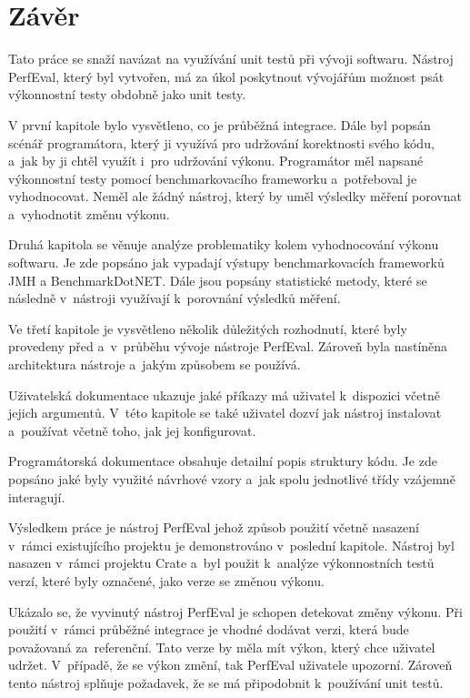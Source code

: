 \chapter{Závěr}

Tato práce se snaží navázat na využívání unit testů při vývoji softwaru.
Nástroj PerfEval, který byl vytvořen, má za úkol poskytnout vývojářům možnost
psát výkonnostní testy obdobně jako unit testy.

V první kapitole bylo vysvětleno, co je průběžná integrace. Dále byl popsán scénář programátora, který
ji využívá pro udržování korektnosti svého kódu, a~jak by ji chtěl využít i~pro udržování výkonu.
Programátor měl napsané výkonnostní testy pomocí benchmarkovacího frameworku a~potřeboval je vyhodnocovat.
Neměl ale žádný nástroj, který by uměl výsledky měření porovnat a~vyhodnotit změnu výkonu.

Druhá kapitola se věnuje analýze problematiky kolem vyhodnocování výkonu softwaru. Je zde popsáno jak vypadají výstupy benchmarkovacích frameworků
JMH a BenchmarkDotNET. Dále jsou popsány statistické metody, které se následně v~nástroji využívají k~porovnání
výsledků měření.

Ve třetí kapitole je vysvětleno několik důležitých rozhodnutí, které byly provedeny před a~v~průběhu vývoje nástroje PerfEval.
Zároveň byla nastíněna architektura nástroje a~jakým způsobem se používá.

Uživatelská dokumentace ukazuje jaké příkazy má uživatel k~dispozici včetně jejich argumentů.
V~této kapitole se také uživatel dozví jak nástroj instalovat a~používat včetně toho, jak jej konfigurovat.

Programátorská dokumentace obsahuje detailní popis struktury kódu. Je zde popsáno jaké byly využité návrhové vzory
a~jak spolu jednotlivé třídy vzájemně interagují.

Výsledkem práce je nástroj PerfEval jehož způsob použití včetně nasazení v~rámci existujícího projektu je demonstrováno
v~poslední kapitole. Nástroj byl nasazen v~rámci projektu Crate a~byl použit k~analýze výkonnostních testů verzí, které byly
označené, jako verze se změnou výkonu.

Ukázalo se, že vyvinutý nástroj PerfEval je schopen detekovat změny výkonu. Při použití v~rámci
průběžné integrace je vhodné dodávat verzi, která bude považovaná za~referenční. Tato verze by měla
mít výkon, který chce uživatel udržet. V~případě, že se výkon změní, tak PerfEval uživatele upozorní.
Zároveň tento nástroj splňuje požadavek, že se má připodobnit k~používání unit testů.

